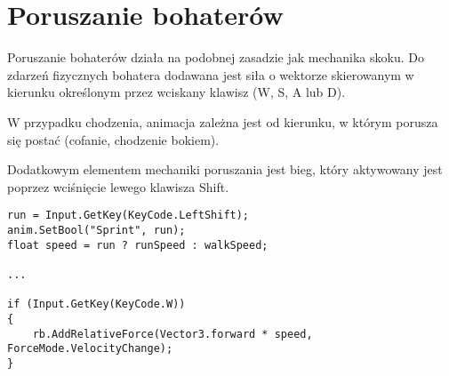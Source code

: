 \section{Poruszanie bohaterów}

Poruszanie bohaterów działa na podobnej zasadzie jak mechanika skoku. Do zdarzeń fizycznych bohatera dodawana jest siła o wektorze skierowanym w kierunku określonym przez wciskany klawisz (W, S, A lub D).

W przypadku chodzenia, animacja zależna jest od kierunku, w którym porusza się postać (cofanie, chodzenie bokiem).

Dodatkowym elementem mechaniki poruszania jest bieg, który aktywowany jest poprzez wciśnięcie lewego klawisza Shift.

\begin{lstlisting}[caption={Fragment kodu mechaniki biegania -- reakcja na wciśnięcie klawisza \name{W}}]
run = Input.GetKey(KeyCode.LeftShift);
anim.SetBool("Sprint", run);
float speed = run ? runSpeed : walkSpeed;

...

if (Input.GetKey(KeyCode.W))
{
    rb.AddRelativeForce(Vector3.forward * speed, ForceMode.VelocityChange);
}
\end{lstlisting}